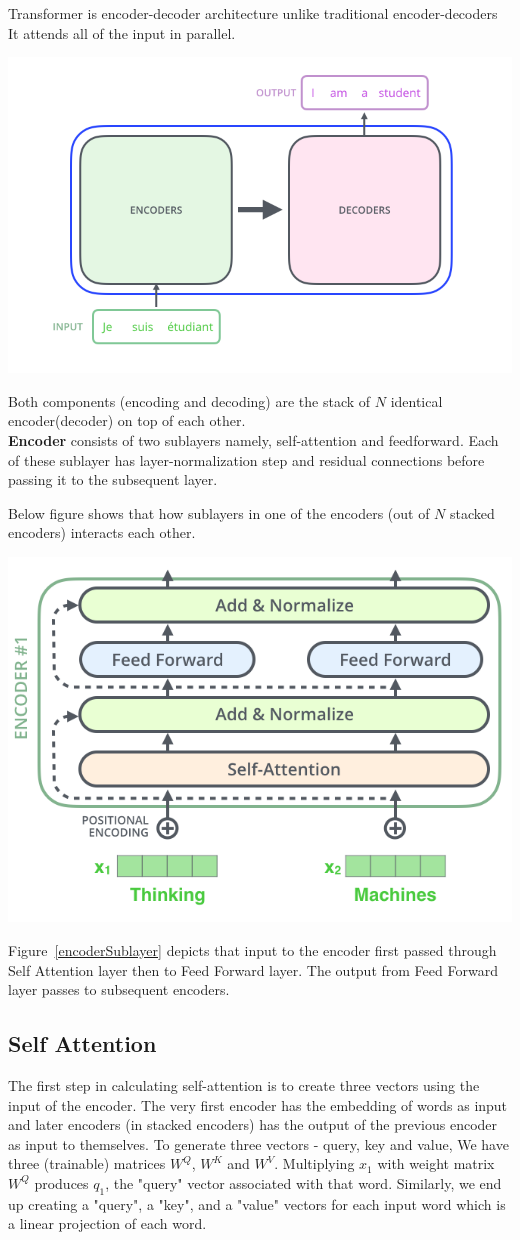 \documentclass{article}
\begin{document}
\begin{multicols}{2}
Transformer is encoder-decoder architecture unlike traditional encoder-decoders It attends all of the input in parallel.

\begin{center}
        \captionsetup{type=figure}
        \includegraphics[width=.40\textwidth]{2.png}
\end{center}

Both components (encoding and decoding) are the stack of $N$ identical encoder(decoder) on top of each other. \\  \textbf{Encoder} consists of two sublayers namely, self-attention and feedforward. Each of these sublayer has layer-normalization step and residual connections before passing it to the subsequent layer.

Below figure shows that how sublayers in one of the encoders (out of $N$ stacked encoders) interacts each other.

\begin{center}
        \captionsetup{type=figure}
        \includegraphics[width=.40\textwidth]{EncoderSublayer.png}
          \label{encoderSublayer}
\end{center}

Figure~\ref{encoderSublayer} depicts that input to the encoder first passed through Self Attention layer then to Feed Forward layer. The output from Feed Forward layer passes to subsequent encoders.


 \subsection{Self Attention}
 The first step in calculating self-attention is to create three vectors using the input of the encoder. The very first encoder has the embedding of words as input and later encoders (in stacked encoders) has the output of the previous encoder as input to themselves. To generate three vectors - query, key and value, We have three (trainable) matrices $W^Q$, $W^K$ and  $W^V$.
 Multiplying $x_1$ with weight matrix $W^Q$ produces $q_1$, the "query" vector associated with that word. Similarly, we end up creating a "query", a "key", and a "value" vectors for each input word which is a linear projection of each word.


\end{multicols}
\end{document}
